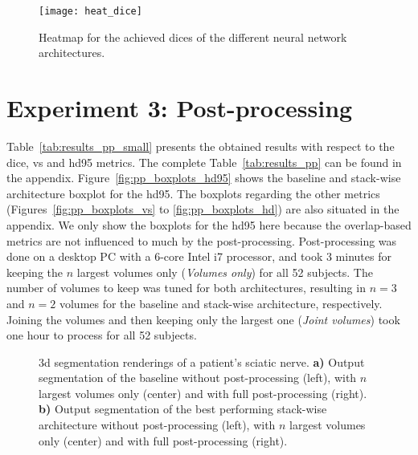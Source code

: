 \begin{figure}[htbp]	
	\centering
	\texttt{[image: heat\_dice]}
    \caption[Heatmap for the \acrlong{dice} for 3D Context]{Heatmap for the achieved \acrlong{dice}s of the different neural network architectures.}
    \label{fig:results_heatmap_dice}
\end{figure}


\section{Experiment 3: Post-processing} \label{sec:exp_pp} %
Table~\ref{tab:results_pp_small} presents the obtained results with respect to the \acrlong{dice}, \acrlong{vs} and \acrlong{hd95} metrics. The complete Table~\ref{tab:results_pp} can be found in the appendix. Figure~\ref{fig:pp_boxplots_hd95} shows the baseline and stack-wise architecture boxplot for the \acrlong{hd95}. The boxplots regarding the other metrics (Figures~\ref{fig:pp_boxplots_vs} to \ref{fig:pp_boxplots_hd}) are also situated in the appendix. We only show the boxplots for the \gls{hd95} here because the overlap-based metrics are not influenced to much by the post-processing.
Post-processing was done on a desktop PC with a 6-core Intel i7 processor, and took 3 minutes for keeping the $n$ largest volumes only (\textit{Volumes only}) for all 52 subjects. The number of volumes to keep was tuned for both architectures, resulting in $n = 3$ and $n = 2$ volumes for the baseline and stack-wise architecture, respectively. Joining the volumes and then keeping only the largest one (\textit{Joint volumes}) took one hour to process for all 52 subjects.

\begin{figure}[htbp]
	\centering
	\hfill
	\subfloat[]
	{
		\label{fig:subfig:pp_5to1_219}
		\texttt{[image: pp\_5to1\_219]}
	}
	\caption[Segmentation Renderings]{\gls{3d} segmentation renderings of a patient's sciatic nerve. \textbf{a)} Output segmentation of the baseline without post-processing (left), with $n$ largest volumes only (center) and with full post-processing (right). \textbf{b)} Output segmentation of the best performing stack-wise architecture without post-processing (left), with $n$ largest volumes only (center) and with full post-processing (right).}
	\label{fig:pp_patient_219}  
\end{figure}


